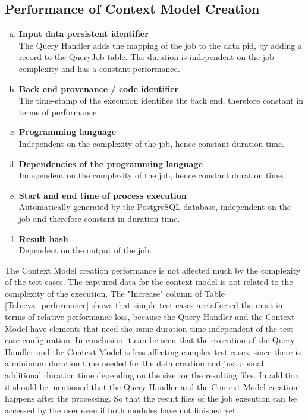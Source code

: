 \documentclass[draft,final]{vutinfth} %
\begin{document}
\subsection{Performance of Context Model Creation}\label{Evaluation:impact_perf_context}

\begin{enumerate}[(a)]
	\item \textbf{Input data persistent identifier} \\
	The Query Handler adds the mapping of the job to the data pid, by adding a record to the QueryJob table. The duration is independent on the job complexity and has a constant performance.
	\item \textbf{Back end provenance / code identifier} \\
	The time-stamp of the execution identifies the back end, therefore constant in terms of performance.
	\item \textbf{Programming language} \\
	Independent on the complexity of the job, hence constant duration time.
	\item \textbf{Dependencies of the programming language} \\
	Independent on the complexity of the job, hence constant duration time.
	\item \textbf{Start and end time of process execution} \\
	Automatically generated by the PostgreSQL database, independent on the job and therefore constant in duration time. 
	\item \textbf{Result hash} \\
	Dependent on the output of the job.
\end{enumerate}




 The Context Model creation performance is not affected much by the complexity of the test cases. The captured data for the context model is not related to the complexity of the execution. The "Increase" column of Table \ref{Tab:eva_performance} shows that simple test cases are affected the most in terms of relative performance loss, because the Query Handler and the Context Model have elements that need the same duration time independent of the test case configuration. In conclusion it can be seen that the execution of the Query Handler and the Context Model is less affecting complex test cases, since there is a minimum duration time needed for the data creation and just a small additional duration time depending on the size for the resulting files. In addition it should be mentioned that the Query Handler and the Context Model creation happens after the processing. So that the result files of the job execution can be accessed by the user even if both modules have not finished yet.
   
\end{document}
